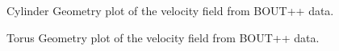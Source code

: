 \documentclass[12pt,a4paper]{article}
\begin{document}
\begin{figure}[H]
	\centering
	\caption{Cylinder Geometry plot of the velocity field from BOUT++ data.}
	\label{fig:cylinder_velocity}
\end{figure}

\begin{figure}[H]
	\centering
	\caption{Torus Geometry plot of the velocity field from BOUT++ data.}
	\label{fig:velocity_torus}
\end{figure}
\end{document}
